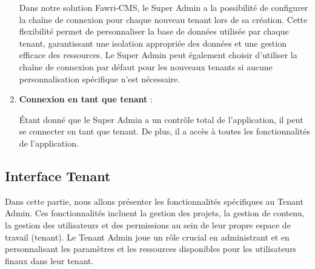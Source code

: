 \begin{enumerate}
\hspace{\parindent}Dans notre solution Fawri-CMS, le Super Admin a la possibilité de configurer la chaîne de connexion pour chaque nouveau tenant lors de sa création. Cette flexibilité permet de personnaliser la base de données utilisée par chaque tenant, garantissant une isolation appropriée des données et une gestion efficace des ressources. Le Super Admin peut également choisir d'utiliser la chaîne de connexion par défaut pour les nouveaux tenants si aucune personnalisation spécifique n'est nécessaire.



\item \textbf{Connexion en tant que tenant} :

Étant donné que le Super Admin a un contrôle total de l'application, il peut se connecter en tant que tenant. De plus, il a accès à toutes les fonctionnalités de l'application.




\end{enumerate}


\subsection{Interface Tenant}

Dans cette partie, nous allons présenter les fonctionnalités spécifiques au Tenant Admin. Ces fonctionnalités incluent la gestion des projets, la gestion de contenu, la gestion des utilisateurs et des permissions au sein de leur propre espace de travail (tenant). Le Tenant Admin joue un rôle crucial en administrant et en personnalisant les paramètres et les ressources disponibles pour les utilisateurs finaux dans leur tenant.




